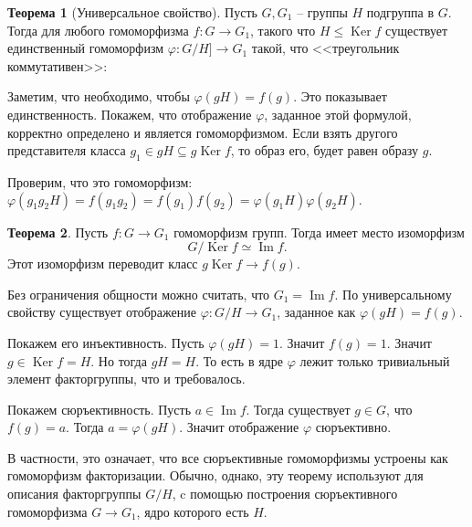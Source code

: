 \documentclass[10pt,a4paper,oneside]{book}
\theoremstyle{definition}
\newtheorem{thm}{\color{red!40!black}Теорема}
\renewcommand{\leq}{\leqslant}
\DeclareMathOperator{\Ker}{Ker}
\renewcommand{\Im}{\operatorname{Im}}
\def\ffi{\varphi}
\def\thrm{\begin{thm}}
\def\ethrm{\end{thm}}
\begin{document}
\thrm[Универсальное свойство] Пусть $G,G_1$ -- группы $H$ подгруппа в $G$. Тогда для любого гомоморфизма $f \colon G\to G_1$, такого что $ H \leq \Ker f$ существует единственный гомоморфизм $\ffi\colon G/H ] \to G_1$ такой, что <<треугольник коммутативен>>:
\begin{center}
\end{center}
\proof Заметим, что необходимо, чтобы $\ffi(gH)=f(g)$. Это показывает единственность. Покажем, что отображение $\ffi$, заданное этой формулой, корректно определено и является гомоморфизмом. Если взять другого представителя класса $g_1\in gH\subseteq g \Ker f $, то образ его, будет равен образу $g$.

Проверим, что это гомоморфизм: $\ffi(g_1g_2H)=f(g_1g_2)=f(g_1)f(g_2)=\ffi(g_1H)\ffi(g_2H).$
\endproof
\ethrm

\thrm Пусть $f\colon G \to G_1$ гомоморфизм групп. Тогда имеет место изоморфизм 
$$G/\Ker f \simeq \Im f.$$
Этот изоморфизм переводит класс $g \Ker f \to f(g)$. 
\ethrm
\proof Без ограничения общности можно считать, что $G_1=\Im f$. По универсальному свойству существует отображение $\ffi : G/H \to G_1$, заданное как $\ffi(gH)=f(g)$.

Покажем его инъективность. Пусть $\ffi(gH)=1$. Значит $f(g)=1$. Значит $g\in \Ker f=H$. Но тогда $gH=H$. То есть в ядре $\ffi$ лежит только тривиальный элемент факторгруппы, что  и требовалось.

Покажем сюръективность. Пусть $a\in \Im f$. Тогда существует $g\in G$, что $f(g)=a$. Тогда $a=\ffi(gH)$. Значит отображение $\ffi$ сюръективно.
\endproof

В частности, это означает, что все сюръективные гомоморфизмы устроены как гомоморфизм факторизации. Обычно, однако, эту теорему используют для описания факторгруппы $G/H$, c помощью построения сюръективного гомоморфизма $G \to G_1$, ядро которого есть $H$. 
\end{document}
